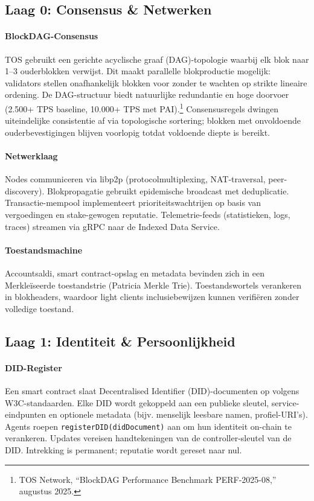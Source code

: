 \documentclass[11pt]{article}
\begin{document}
\subsection{Laag 0: Consensus \& Netwerken}
\paragraph{BlockDAG-Consensus} TOS gebruikt een gerichte acyclische graaf (DAG)-topologie waarbij elk blok naar 1--3 ouderblokken verwijst. Dit maakt parallelle blokproductie mogelijk: validators stellen onafhankelijk blokken voor zonder te wachten op strikte lineaire ordening. De DAG-structuur biedt natuurlijke redundantie en hoge doorvoer (2.500+ TPS baseline, 10.000+ TPS met PAI).\footnote{TOS Network, ``BlockDAG Performance Benchmark PERF-2025-08,'' augustus 2025.} Consensusregels dwingen uiteindelijke consistentie af via topologische sortering; blokken met onvoldoende ouderbevestigingen blijven voorlopig totdat voldoende diepte is bereikt.

\paragraph{Netwerklaag} Nodes communiceren via libp2p (protocolmultiplexing, NAT-traversal, peer-discovery). Blokpropagatie gebruikt epidemische broadcast met deduplicatie. Transactie-mempool implementeert prioriteitswachtrijen op basis van vergoedingen en stake-gewogen reputatie. Telemetrie-feeds (statistieken, logs, traces) streamen via gRPC naar de Indexed Data Service.

\paragraph{Toestandsmachine} Accountsaldi, smart contract-opslag en metadata bevinden zich in een Merkleïseerde toestandstrie (Patricia Merkle Trie). Toestandswortels verankeren in blokheaders, waardoor light clients inclusiebewijzen kunnen verifiëren zonder volledige toestand.

\subsection{Laag 1: Identiteit \& Persoonlijkheid}
\paragraph{DID-Register} Een smart contract slaat Decentralised Identifier (DID)-documenten op volgens W3C-standaarden. Elke DID wordt gekoppeld aan een publieke sleutel, service-eindpunten en optionele metadata (bijv. menselijk leesbare namen, profiel-URI's). Agents roepen \texttt{registerDID(didDocument)} aan om hun identiteit on-chain te verankeren. Updates vereisen handtekeningen van de controller-sleutel van de DID. Intrekking is permanent; reputatie wordt gereset naar nul.
\end{document}

